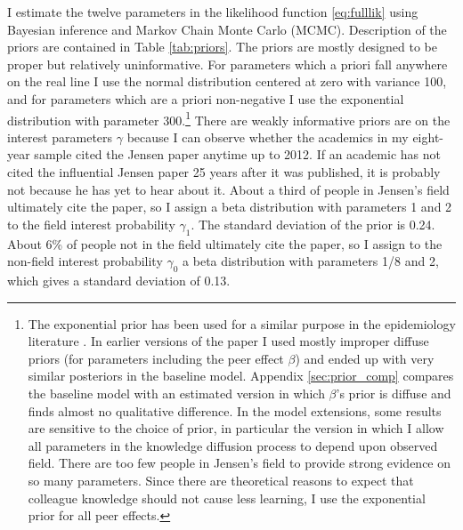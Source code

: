 I estimate the twelve parameters in the likelihood function \eqref{eq:fulllik}
using Bayesian inference and Markov Chain Monte Carlo (MCMC).  Description of the priors
are contained in Table \ref{tab:priors}.  The priors are mostly designed to be proper but 
relatively uninformative.  For parameters which a priori fall anywhere on the real line
I use the normal distribution centered at zero with variance 100, and for parameters which
are a priori non-negative I use the exponential distribution with parameter 300.\footnote{The exponential prior has 
been used for a similar purpose in the epidemiology literature  \citep{cauchemez2004bayesian}.  In earlier 
versions of the paper I used mostly improper diffuse priors (for parameters including the peer effect $\beta$) and ended up with very similar posteriors in the baseline model.  Appendix \ref{sec:prior_comp} compares the baseline model with an estimated version in which $\beta$'s prior is diffuse and finds almost no qualitative difference.  In the model extensions, some results are sensitive to the choice of prior, in particular the version in which I allow all parameters in the knowledge diffusion process to depend upon observed field.  There are too few people in Jensen's field to provide strong evidence on so many parameters.  Since there are theoretical reasons to expect that colleague knowledge should not cause less learning, I use the exponential prior for all peer effects.}
There are weakly informative priors are on the interest parameters $\gamma$ because I can
observe whether the academics in my eight-year sample cited the Jensen paper anytime up to
2012. If an academic has not cited the influential Jensen paper 25 years after it was
published, it is probably not because he has yet to hear about it.
About a third of people in Jensen's field ultimately cite the paper, so I assign a beta
distribution with parameters 1 and 2 to the field interest probability
$\gamma_1$. The standard deviation of the prior is 0.24. About 6\% of
people not in the field ultimately cite the paper, so I assign to the
non-field interest probability $\gamma_0$ a beta distribution with
parameters 1/8 and 2, which gives a standard deviation of 0.13.

